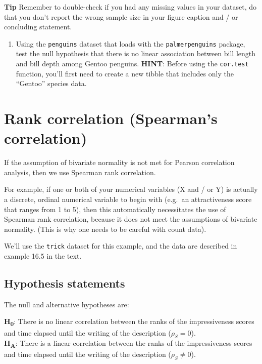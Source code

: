 \documentclass[
]{book}
\providecommand{\tightlist}{%
  \setlength{\itemsep}{0pt}\setlength{\parskip}{0pt}}
\begin{document}
\textbf{Tip}
Remember to double-check if you had any missing values in your dataset, do that you don't report the wrong sample size in your figure caption and / or concluding statement.

\begin{enumerate}
\def\labelenumi{\arabic{enumi}.}
\tightlist
\item
  Using the \texttt{penguins} dataset that loads with the \texttt{palmerpenguins} package, test the null hypothesis that there is no linear association between bill length and bill depth among Gentoo penguins. \textbf{HINT}: Before using the \texttt{cor.test} function, you'll first need to create a new tibble that includes only the ``Gentoo'' species data.
\end{enumerate}

\section{Rank correlation (Spearman's correlation)}\label{rankcorr}

If the assumption of bivariate normality is not met for Pearson correlation analysis, then we use Spearman rank correlation.

For example, if one or both of your numerical variables (X and / or Y) is actually a discrete, ordinal numerical variable to begin with (e.g.~an attractiveness score that ranges from 1 to 5), then this automatically necessitates the use of Spearman rank correlation, because it does not meet the assumptions of bivariate normality. (This is why one needs to be careful with count data).

We'll use the \texttt{trick} dataset for this example, and the data are described in example 16.5 in the text.

\subsection{Hypothesis statements}\label{hypothesis-statements}

The null and alternative hypotheses are:

\textbf{H\textsubscript{0}}: There is no linear correlation between the ranks of the impressiveness scores and time elapsed until the writing of the description (\(\rho_{S} = 0\)).\\
\textbf{H\textsubscript{A}}: There is a linear correlation between the ranks of the impressiveness scores and time elapsed until the writing of the description (\(\rho_{S} \ne 0\)).
\end{document}
